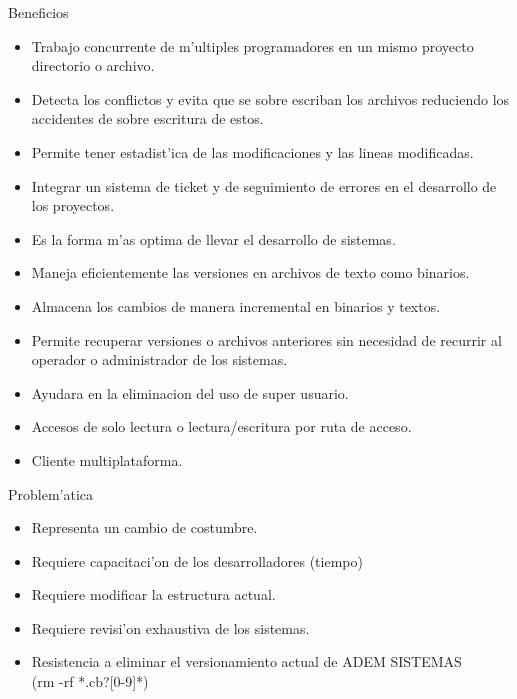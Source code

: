\documentclass[xcolor=dvipsnames]{beamer}
\begin{document}
	\begin{frame}{Beneficios}
	\scriptsize
	{
	\begin{itemize}	
	\item Trabajo concurrente de m'ultiples programadores en un mismo proyecto directorio o archivo.
	\item Detecta los conflictos y evita que se sobre escriban los archivos reduciendo los accidentes
	 de sobre escritura de estos.
	\item Permite tener estadist'{i}ca de las modificaciones y las lineas modificadas.
	\item Integrar un sistema de ticket y de seguimiento de errores en el desarrollo de los proyectos.
	\item Es la forma m'as optima de llevar el desarrollo de sistemas.
	\item Maneja eficientemente las versiones en archivos de texto como binarios.
	\item Almacena los cambios de manera incremental en binarios y textos.
	\item Permite recuperar versiones o archivos anteriores sin necesidad de 
		recurrir al operador o administrador de los sistemas.
	\item Ayudara en la eliminacion del uso de super usuario.
	\item Accesos de solo lectura o lectura/escritura por ruta de acceso.
	\item Cliente multiplataforma.
	\end{itemize}
	}
	\end{frame}
	
	\begin{frame}{Problem'atica}
	\scriptsize
	{
	\begin{itemize}
	\item Representa un cambio de costumbre.
	\item Requiere capacitaci'on de los desarrolladores (tiempo)
	\item Requiere modificar la estructura actual.
	\item Requiere revisi'on exhaustiva de los sistemas.
	\item Resistencia a eliminar el versionamiento actual de ADEM SISTEMAS \\
		(rm -rf *.cb?[0-9]*)
	\end{itemize}
	}
	\end{frame}
\end{document}
